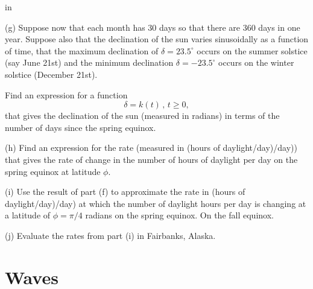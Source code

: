 \documentclass{ximera}
\newcommand{\pskip}{\vskip 0.1 in}
\begin{document}
\begin{question}
\pskip 

(g) Suppose now that each month has 30 days so that there are 360 days in one year. Suppose also that the declination of the sun varies sinusoidally as a function of time, that the maximum declination of $\delta = 23.5^\circ$ occurs on the summer solstice (say June 21st) and the minimum declination $\delta = -23.5^\circ$ occurs on the winter solstice (December 21st). 

Find an expression for a function
\[
     \delta = k(t) \, , \, t\geq 0,
\]
that gives the declination of the sun (measured in radians) in terms of the number of days since the spring equinox. 

(h) Find an expression for the rate (measured in (hours of daylight/day)/day)) that gives the rate of change in the number of hours of daylight per day on the spring equinox at latitude $\phi$.

(i) Use the result of part (f) to approximate the rate in (hours of daylight/day)/day) at which the number of daylight hours per day is changing at a latitude of $\phi = \pi/4$ radians on the spring equinox. On the fall equinox. 

(j) Evaluate the rates from part (i) in Fairbanks, Alaska.


\end{question}


\section*{Waves}
\end{document}
